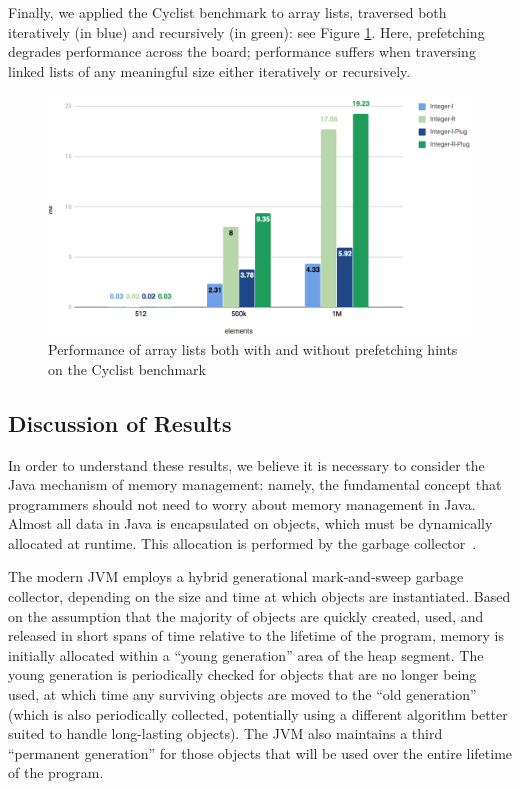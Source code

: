 \documentclass[journal]{IEEEtran}
\begin{document}
Finally, we applied the Cyclist benchmark to array lists, traversed both iteratively (in blue) and recursively (in green): see Figure \ref{fig:cyclistAL}. Here, prefetching degrades performance across the board; performance suffers when traversing linked lists of any meaningful size either iteratively or recursively.

\begin{figure}[b]
    \includegraphics[width=0.9\linewidth]{cyclistAL.png}
    \caption{\small Performance of array lists both with and without prefetching hints on the Cyclist benchmark}
    \label{fig:cyclistAL}
\end{figure}

\subsection{Discussion of Results}

In order to understand these results, we believe it is necessary to consider the Java mechanism of memory management: namely, the fundamental concept that programmers should not need to worry about memory management in Java. Almost all data in Java is encapsulated on objects, which must be dynamically allocated at runtime. This allocation is performed by the garbage collector~\cite{jvmGc}.

The modern JVM employs a hybrid generational mark-and-sweep garbage collector, depending on the size and time at which objects are instantiated. Based on the assumption that the majority of objects are quickly created, used, and released in short spans of time relative to the lifetime of the program, memory is initially allocated within a ``young generation'' area of the heap segment. The young generation is periodically checked for objects that are no longer being used, at which time any surviving objects are moved to the ``old generation'' (which is also periodically collected, potentially using a different algorithm better suited to handle long-lasting objects). The JVM also maintains a third ``permanent generation'' for those objects that will be used over the entire lifetime of the program.
\end{document}
